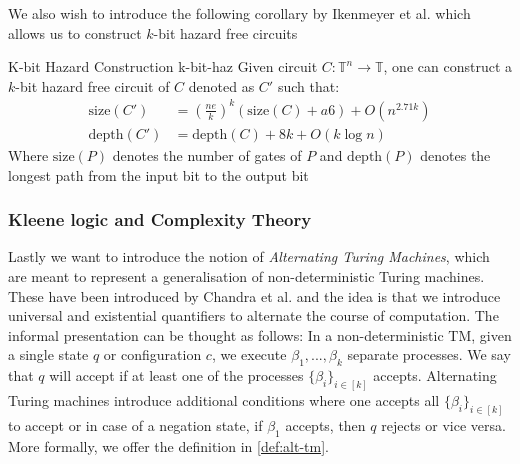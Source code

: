 We also wish to introduce the following corollary by
Ikenmeyer et al. \cite{ikenmeyer_ComplexityHazardfreeCircuits_2019} which allows us
to construct $k$-bit hazard free circuits

\begin{corollarybox}{K-bit Hazard Construction \cite{ikenmeyer_ComplexityHazardfreeCircuits_2019}}{k-bit-haz}
    Given circuit $C: \mathbb{T}^n \to \mathbb{T}$, one can construct a $k$-bit hazard free circuit of $C$ denoted as $C'$
    such that:
    \begin{align*}
        \text{size}(C')\, & = (\frac{ne}{k})^k (\text{size}(C) + a6) + O(n^{2.71k}) \\
        \text{depth}(C') & = \text{depth}(C) + 8k + O(k \log n)
    \end{align*}
    Where $\text{size}(P)$ denotes the number of gates of $P$ and $\text{depth}(P)$ denotes the longest path from
    the input bit to the output bit
\end{corollarybox}


\subsubsection{Kleene logic and Complexity Theory}
Lastly we want to introduce the notion of \textit{Alternating Turing Machines}, which are meant to represent
a generalisation of non-deterministic Turing machines.
These have been introduced by Chandra et al. and the idea is that we introduce universal and existential quantifiers
to alternate the course of computation. The informal presentation can be thought as follows:
In a non-deterministic TM, given a single state $q$ or configuration $c$, we execute
$\beta_1, ..., \beta_k$ separate processes. We say that $q$ will accept if at least one of the processes
$\{\beta_i\}_{i \in [k]}$ accepts. Alternating Turing machines introduce additional conditions where
one accepts all $\{\beta_i\}_{i \in [k]}$ to accept or in case of a negation state, if $\beta_1$ accepts, then 
$q$ rejects or vice versa. More formally, we offer the definition in \ref{def:alt-tm}.

